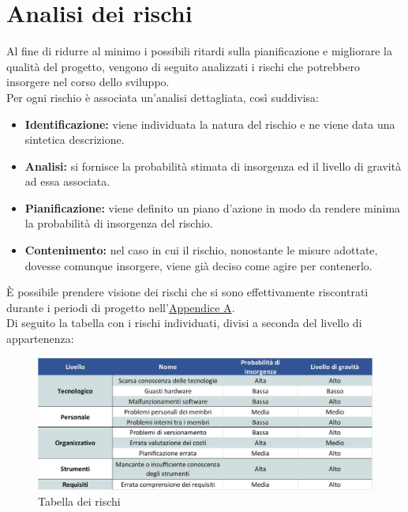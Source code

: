 \newpage

\section{Analisi dei rischi}

Al fine di ridurre al minimo i possibili ritardi sulla pianificazione e migliorare la qualità del progetto, vengono di seguito analizzati i rischi che potrebbero insorgere nel corso dello sviluppo.\\
Per ogni rischio è associata un'analisi dettagliata, così suddivisa:

\begin{itemize}
	\item \textbf{Identificazione:} viene individuata la natura del rischio e ne viene data una sintetica descrizione.
	\item \textbf{Analisi:} si fornisce la probabilità stimata di insorgenza ed il livello di gravità ad essa associata.
	\item \textbf{Pianificazione:} viene definito un piano d'azione in modo da rendere minima la probabilità di insorgenza del rischio. 
	\item \textbf{Contenimento:} nel caso in cui il rischio, nonostante le misure adottate, dovesse comunque insorgere, viene già deciso come agire per contenerlo.
\end{itemize}

È possibile prendere visione dei rischi che si sono effettivamente riscontrati durante i periodi di progetto nell'\hyperref[RiscontroRischi]{Appendice A}.\\
Di seguito la tabella con i rischi individuati, divisi a seconda del livello di appartenenza:

\begin{figure}[h!]
	\centerline{\includegraphics[scale=0.50]{img/TabellaRischi.jpg}}
	\caption{Tabella dei rischi}
	\label{fig:tab_risc}
\end{figure}


